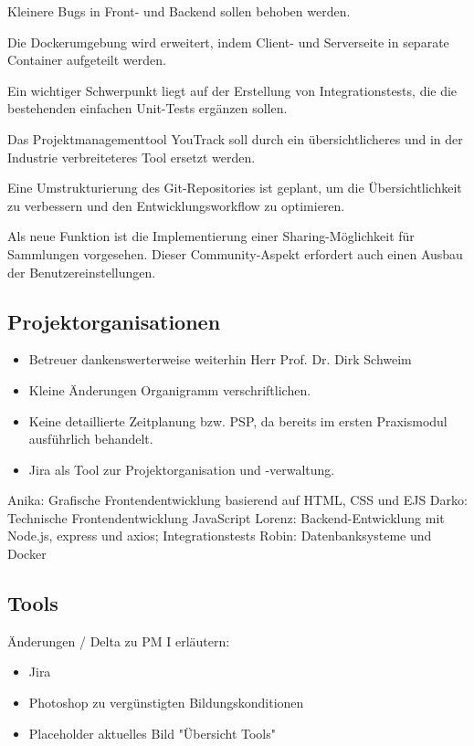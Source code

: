 Kleinere Bugs in Front- und Backend sollen behoben werden.

Die Dockerumgebung wird erweitert, indem Client- und Serverseite in separate Container aufgeteilt werden.

Ein wichtiger Schwerpunkt liegt auf der Erstellung von Integrationstests, die die bestehenden einfachen Unit-Tests ergänzen sollen.

Das Projektmanagementtool YouTrack soll durch ein übersichtlicheres und in der Industrie verbreiteteres Tool ersetzt werden.

Eine Umstrukturierung des Git-Repositories ist geplant, um die Übersichtlichkeit zu verbessern und den Entwicklungsworkflow zu optimieren.

Als neue Funktion ist die Implementierung einer Sharing-Möglichkeit für Sammlungen vorgesehen.
Dieser Community-Aspekt erfordert auch einen Ausbau der Benutzereinstellungen.


\subsection{Projektorganisationen}\label{subsec:subsection-one-three}

\begin{itemize}[noitemsep]
    \item Betreuer dankenswerterweise weiterhin Herr Prof. Dr. Dirk Schweim
    \item Kleine Änderungen Organigramm verschriftlichen.
    \item Keine detaillierte Zeitplanung bzw. PSP, da bereits im ersten Praxismodul ausführlich behandelt.
    \item Jira als Tool zur Projektorganisation und -verwaltung.
\end{itemize}

Anika: Grafische Frontendentwicklung basierend auf HTML, CSS und EJS
Darko: Technische Frontendentwicklung JavaScript
Lorenz: Backend-Entwicklung mit Node.js, express und axios; Integrationstests
Robin: Datenbanksysteme und Docker


\subsection{Tools}\label{subsec:subsection-one-four}

Änderungen / Delta zu PM I erläutern:
\begin{itemize}[noitemsep]
    \item Jira
    \item Photoshop zu vergünstigten Bildungskonditionen
    \item Placeholder aktuelles Bild "Übersicht Tools"
\end{itemize}


